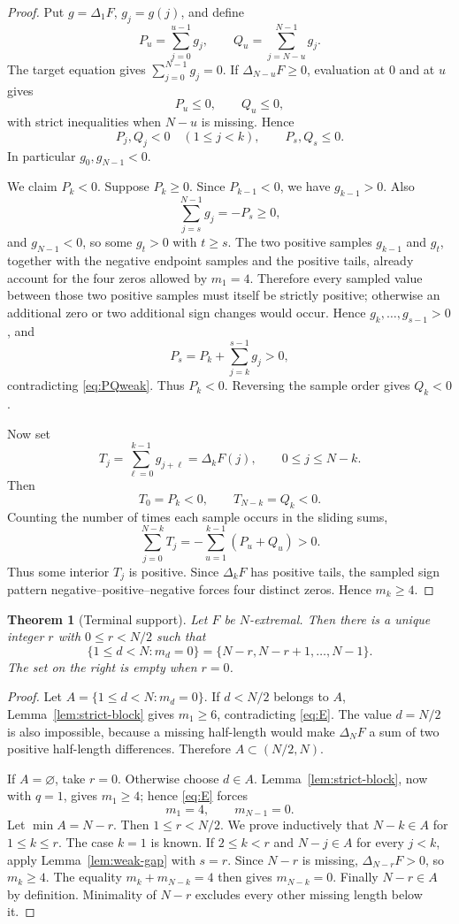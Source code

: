 \documentclass[11pt]{article}
\newtheorem{theorem}{Theorem}[section]
\theoremstyle{definition}
\theoremstyle{remark}
\begin{document}
\begin{proof}
Put \(g=\Delta_1F\), \(g_j=g(j)\), and define
\[
P_u=\sum_{j=0}^{u-1}g_j,
\qquad
Q_u=\sum_{j=N-u}^{N-1}g_j.
\]
The target equation gives \(\sum_{j=0}^{N-1}g_j=0\).  If
\(\Delta_{N-u}F\ge0\), evaluation at \(0\) and at \(u\) gives
\[
P_u\le0,\qquad Q_u\le0,
\tag{4.1}\label{eq:PQweak}
\]
with strict inequalities when \(N-u\) is missing.  Hence
\[
P_j,Q_j<0\quad(1\le j<k),
\qquad
P_s,Q_s\le0.
\tag{4.2}
\]
In particular \(g_0,g_{N-1}<0\).

We claim \(P_k<0\).  Suppose \(P_k\ge0\).  Since \(P_{k-1}<0\),
we have \(g_{k-1}>0\).  Also
\[
\sum_{j=s}^{N-1}g_j=-P_s\ge0,
\]
and \(g_{N-1}<0\), so some \(g_t>0\) with \(t\ge s\).
The two positive samples \(g_{k-1}\) and \(g_t\), together with the
negative endpoint samples and the positive tails, already account for
the four zeros allowed by \(m_1=4\).  Therefore every sampled value
between those two positive samples must itself be strictly positive;
otherwise an additional zero or two additional sign changes would occur.
Hence \(g_k,\ldots,g_{s-1}>0\), and
\[
P_s=P_k+\sum_{j=k}^{s-1}g_j>0,
\]
contradicting \eqref{eq:PQweak}.  Thus \(P_k<0\).  Reversing the sample
order gives \(Q_k<0\).

Now set
\[
T_j=\sum_{\ell=0}^{k-1}g_{j+\ell}
=\Delta_kF(j),
\qquad 0\le j\le N-k.
\]
Then
\[
T_0=P_k<0,\qquad T_{N-k}=Q_k<0.
\]
Counting the number of times each sample occurs in the sliding sums,
\[
\sum_{j=0}^{N-k}T_j
=
-\sum_{u=1}^{k-1}(P_u+Q_u)>0.
\]
Thus some interior \(T_j\) is positive.  Since \(\Delta_kF\) has positive
tails, the sampled sign pattern negative--positive--negative forces four
distinct zeros.  Hence \(m_k\ge4\).
\end{proof}

\begin{theorem}[Terminal support]\label{thm:terminal}
Let \(F\) be \(N\)-extremal.  Then there is a unique integer
\(r\) with \(0\le r<N/2\) such that
\[
\{1\le d<N:m_d=0\}
=
\{N-r,N-r+1,\ldots,N-1\}.
\tag{4.3}\label{eq:terminal}
\]
The set on the right is empty when \(r=0\).
\end{theorem}

\begin{proof}
Let \(A=\{1\le d<N:m_d=0\}\).  If \(d<N/2\) belongs to \(A\),
Lemma~\ref{lem:strict-block} gives \(m_1\ge6\), contradicting
\eqref{eq:E}.  The value \(d=N/2\) is also impossible, because a missing
half-length would make \(\Delta_NF\) a sum of two positive half-length
differences.  Therefore \(A\subset(N/2,N)\).

If \(A=\varnothing\), take \(r=0\).  Otherwise choose \(d\in A\).
Lemma~\ref{lem:strict-block}, now with \(q=1\), gives \(m_1\ge4\);
hence \eqref{eq:E} forces
\[
m_1=4,\qquad m_{N-1}=0.
\]
Let \(\min A=N-r\).  Then \(1\le r<N/2\).
We prove inductively that \(N-k\in A\) for \(1\le k\le r\).
The case \(k=1\) is known.  If \(2\le k<r\) and
\(N-j\in A\) for every \(j<k\), apply
Lemma~\ref{lem:weak-gap} with \(s=r\).  Since \(N-r\) is missing,
\(\Delta_{N-r}F>0\), so \(m_k\ge4\).  The equality
\(m_k+m_{N-k}=4\) then gives \(m_{N-k}=0\).  Finally \(N-r\in A\)
by definition.  Minimality of \(N-r\) excludes every other missing
length below it.
\end{proof}
\end{document}
